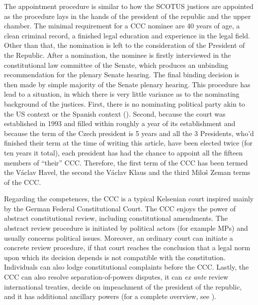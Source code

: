 \documentclass[
  11pt,
]{article}
\begin{document}
The appointment procedure is similar to how the SCOTUS justices are appointed as the procedure lays in the hands of the president of the republic and the upper chamber. The minimal requirement for a CCC nominee are 40 years of age, a clean criminal record, a finished legal education and experience in the legal field. Other than that, the nomination is left to the consideration of the President of the Republic. After a nomination, the nominee is firstly interviewed in the constitutional law committee of the Senate, which produces an unbinding recommendation for the plenary Senate hearing. The final binding decision is then made by simple majority of the Senate plenary hearing. This procedure has lead to a situation, in which there is very little variance as to the nominating background of the justices. First, there is no nominating political party akin to the US context or the Spanish context (). Second, because the court was established in 1993 and filled within roughly a year of its establishment and because the term of the Czech president is 5 years and all the 3 Presidents, who'd finished their term at the time of writing this article, have been elected twice (for ten years it total), each president has had the chance to appoint all the fifteen members of ``their'' CCC. Therefore, the first term of the CCC has been termed the Václav Havel, the second the Václav Klaus and the third Miloš Zeman terms of the CCC.

Regarding the competences, the CCC is a typical Kelsenian court inspired mainly by the German Federal Constitutional Court. The CCC enjoys the power of abstract constitutional review, including constitutional amendments. The abstract review procedure is initiated by political actors (for example MPs) and usually concerns political issues. Moreover, an ordinary court can initiate a concrete review procedure, if that court reaches the conclusion that a legal norm upon which its decision depends is not compatible with the constitution. Individuals can also lodge constitutional complaints before the CCC. Lastly, the CCC can also resolve separation-of-powers disputes, it can \emph{ex ante} review international treaties, decide on impeachment of the president of the republic, and it has additional ancillary powers (for a complete overview, see ).
\end{document}
